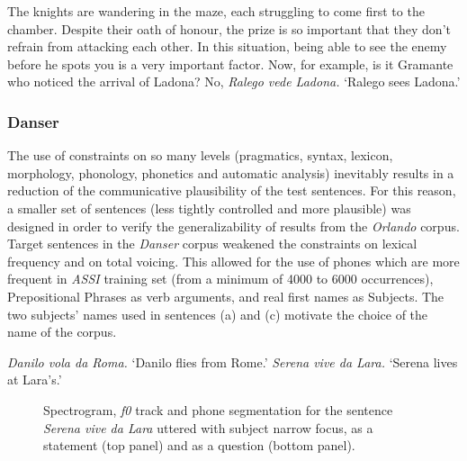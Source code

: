 \clearpage
\eal
\ex The knights are wandering in the maze, each struggling to come first to the chamber. Despite their oath of honour, the prize is so important that they don't refrain from attacking each other. In this situation, being able to see the enemy before he spots you is a very important factor. Now, for example, is it Gramante who noticed the arrival of Ladona?  
\ex No, \textit{Ralego vede Ladona.}
\ex `Ralego sees Ladona.'
\zl

\subsubsection{Danser}\label{sec4212}
The use of constraints on so many levels (pragmatics, syntax, lexicon, morphology, phonology, phonetics and automatic analysis) inevitably results in a reduction of the communicative plausibility of the test sentences. For this reason, a smaller set of sentences (less tightly controlled and more plausible) was designed in order to verify the generalizability of results from the \textit{Orlando} corpus. Target sentences in the \textit{Danser} corpus weakened the constraints on lexical frequency and on total voicing. This allowed for the use of phones which are more frequent in \textit{ASSI} training set (from a minimum of 4000 to 6000 occurrences), Prepositional Phrases as verb arguments, and real first names as Subjects. The two subjects' names used in sentences (a) and (c) motivate the choice of the name of the corpus.

\eal
\ex \textit{Danilo vola da Roma.}
\ex `Danilo flies from Rome.'
\ex \textit{Serena vive da Lara.}
\ex `Serena lives at Lara's.'
\zl

\begin{figure}
\centering
{}
\caption{Spectrogram, \textit{f0} track and phone segmentation for the sentence \textit{Serena vive da Lara} uttered with subject narrow focus, as a statement (top panel) and as a question (bottom panel).}
\label{fig401}\end{figure}

